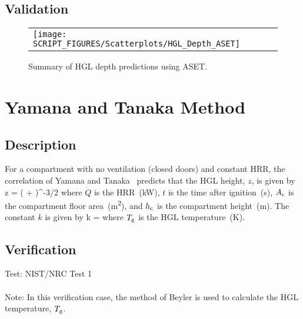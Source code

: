 \subsection*{Validation}

\begin{figure}[!ht]
\begin{center}
\begin{tabular}{l}
\texttt{[image: SCRIPT\_FIGURES/Scatterplots/HGL\_Depth\_ASET]}
\end{tabular}
\end{center}
\caption[Summary of HGL depth predictions using ASET]
{Summary of HGL depth predictions using ASET.}
\label{HGL_Depth_ASET}
\end{figure}


\clearpage


\section{Yamana and Tanaka Method}

\subsection*{Description}

For a compartment with no ventilation (closed doors) and constant HRR, the correlation of Yamana and Tanaka~\cite{Tanaka:1} predicts that the HGL height, $z$, is given by
\be
z = \left(  +  \right)^{-3/2}
\label{eq:Yamana_Tanaka}
\ee
where $\dot Q$ is the HRR~(\si{kW}), $t$ is the time after ignition~(\si{s}), $A\sb{c}$ is the compartment floor area~(\si{m^2}), and $h\sb{c}$ is the compartment height~(\si{m}). The constant $k$ is given by
\be
k = 
\ee
where $T\sb{g}$ is the HGL temperature~(\si{K}).

\subsection*{Verification}

Test: NIST/NRC Test 1
\\ \\
\noindent Note: In this verification case, the method of Beyler is used to calculate the HGL temperature, $T\sb{g}$.


